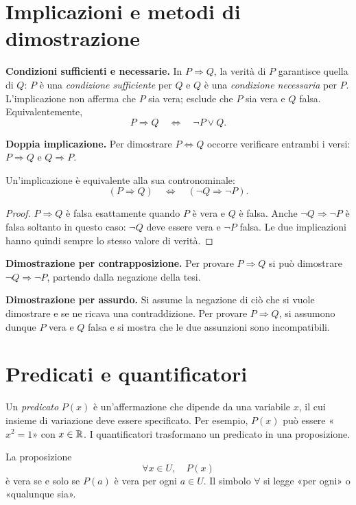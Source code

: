 \section{Implicazioni e metodi di dimostrazione}

\textbf{Condizioni sufficienti e necessarie.} In $P\Rightarrow Q$, la verità di $P$ garantisce quella di $Q$: $P$ è una \emph{condizione sufficiente} per $Q$ e $Q$ è una \emph{condizione necessaria} per $P$. L'implicazione non afferma che $P$ sia vera; esclude che $P$ sia vera e $Q$ falsa. Equivalentemente,
\[
  P\Rightarrow Q\quad\Longleftrightarrow\quad \neg P\lor Q.
\]

\textbf{Doppia implicazione.} Per dimostrare $P\Leftrightarrow Q$ occorre verificare entrambi i versi: $P\Rightarrow Q$ e $Q\Rightarrow P$.

\begin{proposizione}[Contrapposizione]
Un'implicazione è equivalente alla sua contronominale:
\[
  (P\Rightarrow Q)\quad\Longleftrightarrow\quad
  (\neg Q\Rightarrow\neg P).
\]
\end{proposizione}
\begin{proof}
$P\Rightarrow Q$ è falsa esattamente quando $P$ è vera e $Q$ è falsa. Anche $\neg Q\Rightarrow\neg P$ è falsa soltanto in questo caso: $\neg Q$ deve essere vera e $\neg P$ falsa. Le due implicazioni hanno quindi sempre lo stesso valore di verità.
\end{proof}

\textbf{Dimostrazione per contrapposizione.} Per provare $P\Rightarrow Q$ si può dimostrare $\neg Q\Rightarrow\neg P$, partendo dalla negazione della tesi.

\textbf{Dimostrazione per assurdo.} Si assume la negazione di ciò che si vuole dimostrare e se ne ricava una contraddizione. Per provare $P\Rightarrow Q$, si assumono dunque $P$ vera e $Q$ falsa e si mostra che le due assunzioni sono incompatibili.

\section{Predicati e quantificatori}

Un \emph{predicato} $P(x)$ è un'affermazione che dipende da una variabile $x$, il cui insieme di variazione deve essere specificato. Per esempio, $P(x)$ può essere «$x^2=1$» con $x\in\mathbb{R}$. I quantificatori trasformano un predicato in una proposizione.

\begin{definizione}
La proposizione
\[
  \forall x\in U,\quad P(x)
\]
è vera se e solo se $P(a)$ è vera per ogni $a\in U$. Il simbolo $\forall$ si legge «per ogni» o «qualunque sia».
\end{definizione}

